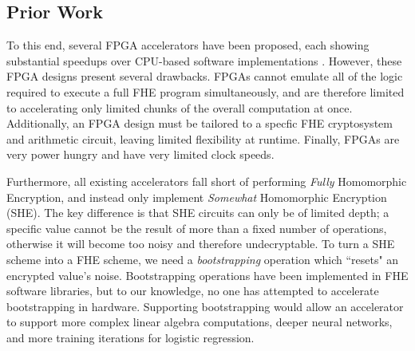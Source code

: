 \subsection{Prior Work}

To this end, several FPGA accelerators have been proposed, each showing
substantial speedups over CPU-based software implementations
\cite{riazi:asplos20:heax, roy:hpca19:he-fpga}.
However, these FPGA designs present several drawbacks. 
FPGAs cannot emulate all of the logic required to execute a full FHE program
simultaneously, and are therefore limited to accelerating only limited chunks
of the overall computation at once.
Additionally, an FPGA design must be tailored to a specfic FHE cryptosystem and
arithmetic circuit, leaving limited flexibility at runtime. 
Finally, FPGAs are very power hungry and have very limited clock speeds.

Furthermore, all existing accelerators fall short of performing
\emph{Fully} Homomorphic Encryption, and instead only implement
\emph{Somewhat} Homomorphic Encryption (SHE). The key difference is that
SHE circuits can only be of limited depth; a specific value cannot be the
result of more than a fixed number of operations, otherwise it will become
too noisy and therefore undecryptable. 
To turn a SHE scheme into a FHE scheme,
we need a \emph{bootstrapping} operation which ``resets" an encrypted value's
noise. Bootstrapping operations have been implemented in FHE software
libraries, but to our knowledge, no one has attempted to accelerate
bootstrapping in hardware. Supporting bootstrapping would allow an accelerator
to support more complex linear algebra computations, deeper neural networks,
and more training iterations for logistic regression.
